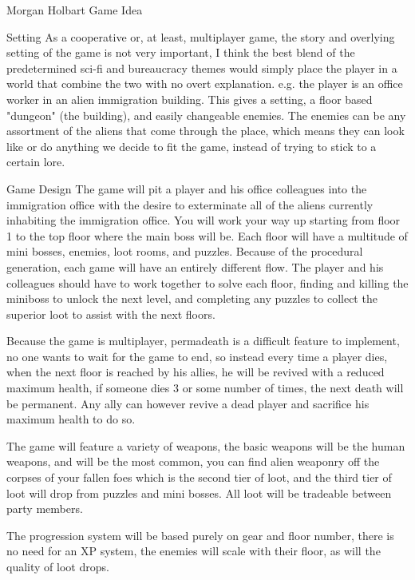 \documentclass[12pt]{report}
\begin{document}
\begin{section}{Morgan Holbart Game Idea}
\begin{subsection}{Setting}
As a cooperative or, at least, multiplayer game, the story and overlying setting of the game is not very important,
I think the best blend of the predetermined sci-fi and bureaucracy themes would simply place the player in a world
that combine the two with no overt explanation. e.g. the player is an office worker in an alien immigration building.
This gives a setting, a floor based "dungeon" (the building), and easily changeable enemies. The enemies can be
any assortment of the aliens that come through the place, which means they can look like or do anything we decide to
fit the game, instead of trying to stick to a certain lore.
\end{subsection}

\begin{subsection}{Game Design}
The game will pit a player and his office colleagues into the immigration office with the desire to exterminate all
of the aliens currently inhabiting the immigration office. You will work your way up starting from floor 1 to the 
top floor where the main boss will be. Each floor will have a multitude of mini bosses, enemies, loot rooms, and 
puzzles. Because of the procedural generation, each game will have an entirely different flow. The player and his
colleagues should have to work together to solve each floor, finding and killing the miniboss to unlock the next level,
and completing any puzzles to collect the superior loot to assist with the next floors.

Because the game is multiplayer, permadeath is a difficult feature to implement, no one wants to wait for the game to 
end, so instead every time a player dies, when the next floor is reached by his allies, he will be revived with a 
reduced maximum health, if someone dies 3 or some number of times, the next death will be permanent. Any ally can 
however revive a dead player and sacrifice his maximum health to do so.

The game will feature a variety of weapons, the basic weapons will be the human weapons, and will be the most common,
you can find alien weaponry off the corpses of your fallen foes which is the second tier of loot, and the third tier 
of loot will drop from puzzles and mini bosses. All loot will be tradeable between party members.

The progression system will be based purely on gear and floor number, there is no need for an XP system, the enemies
will scale with their floor, as will the quality of loot drops.
\end{subsection}


\end{section}
\end{document}
